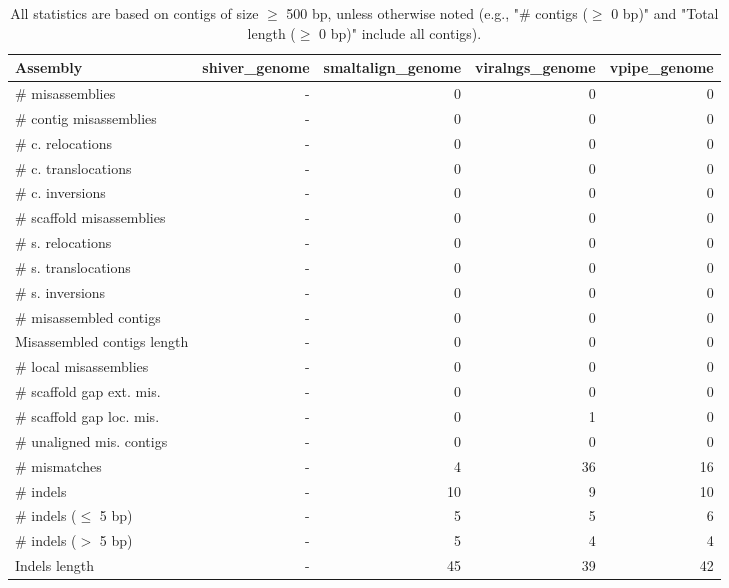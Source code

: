 \documentclass[12pt,a4paper]{article}
\begin{document}
\begin{table}[ht]
\begin{center}
\caption{All statistics are based on contigs of size $\geq$ 500 bp, unless otherwise noted (e.g., "\# contigs ($\geq$ 0 bp)" and "Total length ($\geq$ 0 bp)" include all contigs).}
\begin{tabular}{|l*{4}{|r}|}
\hline
Assembly & shiver\_genome & smaltalign\_genome & viralngs\_genome & vpipe\_genome \\ \hline
\# misassemblies & - & 0 & 0 & 0 \\ \hline
\hspace{2mm}\# contig misassemblies & - & 0 & 0 & 0 \\ \hline
\hspace{5mm}\# c. relocations & - & 0 & 0 & 0 \\ \hline
\hspace{5mm}\# c. translocations & - & 0 & 0 & 0 \\ \hline
\hspace{5mm}\# c. inversions & - & 0 & 0 & 0 \\ \hline
\hspace{2mm}\# scaffold misassemblies & - & 0 & 0 & 0 \\ \hline
\hspace{5mm}\# s. relocations & - & 0 & 0 & 0 \\ \hline
\hspace{5mm}\# s. translocations & - & 0 & 0 & 0 \\ \hline
\hspace{5mm}\# s. inversions & - & 0 & 0 & 0 \\ \hline
\# misassembled contigs & - & 0 & 0 & 0 \\ \hline
Misassembled contigs length & - & 0 & 0 & 0 \\ \hline
\# local misassemblies & - & 0 & 0 & 0 \\ \hline
\# scaffold gap ext. mis. & - & 0 & 0 & 0 \\ \hline
\# scaffold gap loc. mis. & - & 0 & 1 & 0 \\ \hline
\# unaligned mis. contigs & - & 0 & 0 & 0 \\ \hline
\# mismatches & - & 4 & 36 & 16 \\ \hline
\# indels & - & 10 & 9 & 10 \\ \hline
\hspace{5mm}\# indels ($\leq$ 5 bp) & - & 5 & 5 & 6 \\ \hline
\hspace{5mm}\# indels ($>$ 5 bp) & - & 5 & 4 & 4 \\ \hline
Indels length & - & 45 & 39 & 42 \\ \hline
\end{tabular}
\end{center}
\end{table}
\end{document}
